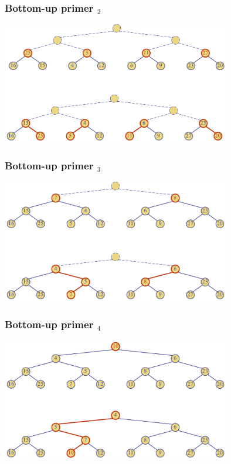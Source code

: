 \documentclass[compress,aspectratio=169]{beamer}
\begin{document}
\begin{frame}[fragile]
  \frametitle{Bottom-up primer $_2$}
  \begin{center}
    \includegraphics[width=10cm]{asp-09-pic15.png}
  \end{center}
\end{frame}

\begin{frame}[fragile]
  \frametitle{Bottom-up primer $_3$}
  \begin{center}
    \includegraphics[width=10cm]{asp-09-pic16.png}
  \end{center}
\end{frame}

\begin{frame}[fragile]
  \frametitle{Bottom-up primer $_4$}
  \begin{center}
    \includegraphics[width=10cm]{asp-09-pic17.png}
  \end{center}
\end{frame}
\end{document}
